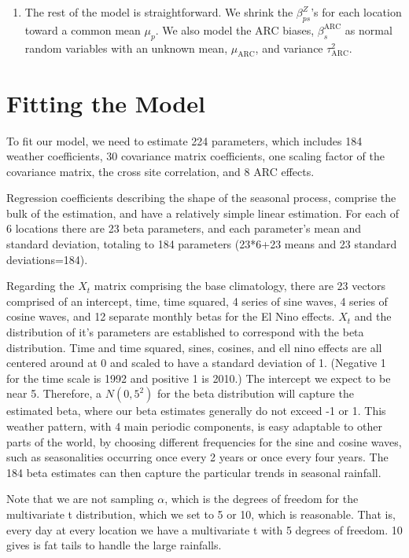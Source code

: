 \documentclass[12pt]{article}
\begin{document}
\begin{enumerate}
\item The rest of the model is straightforward. We shrink the $\beta_{ps}^Z$'s for each location toward a common mean $\mu_p$. We also model the ARC biases, $\beta^\text{ARC}_s$ as normal random variables with an unknown mean, $\mu_\text{ARC}$, and variance $\tau_\text{ARC}^2$.
\end{enumerate}

\section{Fitting the Model}
\label{sec:fit}

To fit our model, we need to estimate 224 parameters, which includes 184 weather coefficients, 30 covariance matrix coefficients, one scaling factor of the covariance matrix, the cross site correlation, and 8 ARC effects. 

Regression coefficients describing the shape of the seasonal process, comprise the bulk of the estimation, and have a relatively simple linear estimation. For each of 6 locations there are 23 beta parameters, and each parameter's mean and standard deviation, totaling to 184 parameters (23*6+23 means and 23 standard deviations=184). 

Regarding the $X_t$ matrix comprising the base climatology, there are 23 vectors comprised of an intercept, time, time squared, 4 series of sine waves, 4 series of cosine waves, and 12 separate monthly betas for the El Nino effects. $X_t$ and the distribution of it's parameters are established to correspond with the beta distribution. Time and time squared, sines, cosines, and ell nino effects are all centered around at 0 and scaled to have a standard deviation of 1. (Negative 1 for the time scale is 1992 and positive 1 is 2010.) The  intercept we expect to be near 5. Therefore, a $N(0,5^2)$ for the beta distribution will capture the estimated beta, where our beta estimates generally do not exceed -1 or 1. This weather pattern, with 4 main periodic components, is easy adaptable to other parts of the world, by choosing different frequencies for the sine and cosine waves, such as seasonalities occurring once every 2 years or once every four years. The 184 beta estimates can then capture the particular trends in seasonal rainfall. 

Note that we are not sampling $\alpha$, which is the degrees of freedom for the multivariate t distribution, which we set to 5 or 10, which is reasonable. That is, every day at every location we have a multivariate t with 5 degrees of freedom. 10 gives is fat tails to handle the large rainfalls. 
\end{document}

